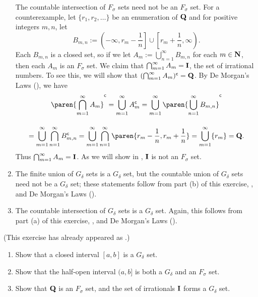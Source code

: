 \documentclass{lew98_solutions}
\begin{document}
\begin{solution}
\begin{enumerate}
        The countable intersection of \( F_{\sigma} \) sets need not be an \( F_{\sigma} \) set. For a counterexample, let \( \{ r_1, r_2, \ldots \} \) be an enumeration of \( \mathbf{Q} \) and for positive integers \( m, n \), let
        \[
            B_{m, n} := \left( -\infty, r_m - \frac{1}{n} \right] \cup \left[ r_m + \frac{1}{n}, \infty \right).
        \]
        Each \( B_{m, n} \) is a closed set, so if we let \( A_m := \bigcup_{n=1}^{\infty} B_{m, n} \) for each \( m \in \mathbf{N} \), then each \( A_m \) is an \( F_{\sigma} \) set. We claim that \( \bigcap_{m=1}^{\infty} A_m = \mathbf{I} \), the set of irrational numbers. To see this, we will show that \( (\bigcap_{m=1}^{\infty} A_m)^{\mathsf{c}} = \mathbf{Q} \). By De Morgan's Laws (), we have
        \begin{multline*}
            \setcomp{\paren{ \bigcap_{m=1}^{\infty} A_m }} = \bigcup_{m=1}^{\infty} \setcomp{A_m} = \bigcup_{m=1}^{\infty} \setcomp{\paren{ \bigcup_{n=1}^{\infty} B_{m, n} }} \\[4mm]
            = \bigcup_{m=1}^{\infty} \bigcap_{n=1}^{\infty} \setcomp{B_{m, n}} = \bigcup_{m=1}^{\infty} \bigcap_{n=1}^{\infty} \paren{ r_m - \frac{1}{n}, r_m + \frac{1}{n} } = \bigcup_{m=1}^{\infty} \{ r_m \} = \Q.
        \end{multline*}
        Thus \( \bigcap_{m=1}^{\infty} A_m = \mathbf{I} \). As we will show in , \( \mathbf{I} \) is not an \( F_{\sigma} \) set.

        \item The finite union of \( G_{\delta} \) sets is a \( G_{\delta} \) set, but the countable union of \( G_{\delta} \) sets need not be a \( G_{\delta} \) set; these statements follow from part (b) of this exercise, , and De Morgan's Laws ().

        \item The countable intersection of \( G_{\delta} \) sets is a \( G_{\delta} \) set. Again, this follows from part (a) of this exercise, , and De Morgan's Laws ().
    \end{enumerate}
\end{solution}

\begin{exercise}
\label{ex:3.5.3}
    (This exercise has already appeared as .)
    \begin{enumerate}
        \item Show that a closed interval \( [a, b] \) is a \( G_{\delta} \) set.
        
        \item Show that the half-open interval \( (a, b] \) is both a \( G_{\delta} \) and an \( F_{\sigma} \) set.

        \item Show that \( \mathbf{Q} \) is an \( F_{\sigma} \) set, and the set of irrationals \( \mathbf{I} \) forms a \( G_{\delta} \) set.
    \end{enumerate}
\end{exercise}
\end{document}
